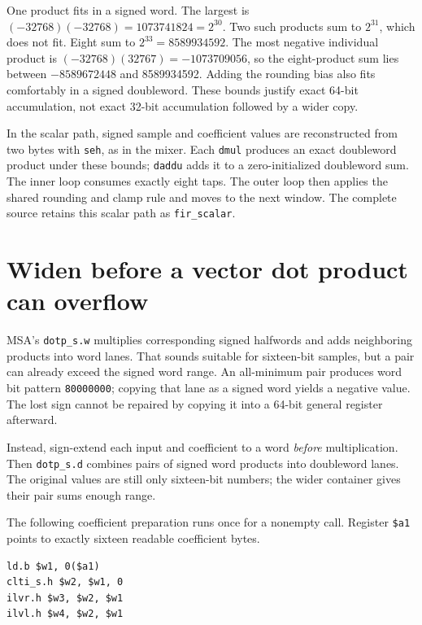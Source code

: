 \begin{samepage}
  One product fits in a signed word. The largest is
  $(-32768)(-32768)=1073741824=2^{30}$. Two such products sum to $2^{31}$, which
  does not fit. Eight sum to $2^{33}=8589934592$. The most negative individual
  product is $(-32768)(32767)=-1073709056$, so the eight-product sum lies between
  $-8589672448$ and 8589934592. Adding the rounding bias also fits comfortably in
  a signed doubleword. These bounds justify exact 64-bit accumulation, not exact
  32-bit accumulation followed by a wider copy.
  \par
\end{samepage}

In the scalar path, signed sample and coefficient values are reconstructed from
two bytes with \texttt{seh}, as in the mixer. Each \texttt{dmul} produces an
exact doubleword product under these bounds; \texttt{daddu} adds it to a
zero-initialized doubleword sum. The inner loop consumes exactly eight taps.
The outer loop then applies the shared rounding and clamp rule and moves to the
next window. The complete source retains this scalar path as \texttt{fir\_scalar}.

\section{Widen before a vector dot product can overflow}

MSA's \texttt{dotp\_s.w} multiplies corresponding signed halfwords and adds
neighboring products into word lanes. That sounds suitable for sixteen-bit
samples, but a pair can already exceed the signed word range. An all-minimum
pair produces word bit pattern \texttt{80000000}; copying that lane as a signed
word yields a negative value. The lost sign cannot be repaired by copying it
into a 64-bit general register afterward.

Instead, sign-extend each input and coefficient to a word \emph{before}
multiplication. Then \texttt{dotp\_s.d} combines pairs of signed word products
into doubleword lanes. The original values are still only sixteen-bit numbers;
the wider container gives their pair sums enough range.

The following coefficient preparation runs once for a nonempty call. Register
\texttt{\$a1} points to exactly sixteen readable coefficient bytes.
\begin{verbatim}
ld.b $w1, 0($a1)
clti_s.h $w2, $w1, 0
ilvr.h $w3, $w2, $w1
ilvl.h $w4, $w2, $w1
\end{verbatim}

